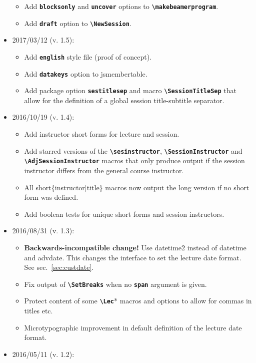 \documentclass[english]{article}
\newcommand*\jmacro[1]{\textbf{\texttt{#1}}}
\newcommand*\jcsmacro[1]{\jmacro{\textbackslash{#1}}}
\newcommand*\joption[1]{\textbf{\texttt{#1}}}
\newcommand*\jsmt{\textsf{jsmembertable}}
\begin{document}
\begin{itemize}
\begin{itemize}
	    \item Add \joption{blocksonly} and \joption{uncover} options to \jcsmacro{makebeamerprogram}.
	    \item Add \joption{draft} option to \jcsmacro{NewSession}.
    \end{itemize}
\item 2017/03/12 (v. 1.5):
	\begin{itemize}
		\item Add \joption{english} style file (proof of concept).
		\item Add \joption{datakeys} option to \jsmt.
		\item Add package option \joption{sestitlesep} and macro \jcsmacro{SessionTitleSep} that
		allow for the definition of a global session title-subtitle	separator.
	\end{itemize}
\item 2016/10/19 (v. 1.4):
	\begin{itemize}
		\item Add instructor short forms for lecture and session.
		\item Add starred versions of the \jcsmacro{sesinstructor}, \jcsmacro{SessionInstructor} and \jcsmacro{AdjSessionInstructor} macros that only produce output if the session instructor differs from the general course instructor.
		\item All short\{instructor|title\} macros now output the long version if no short form was defined.
		\item Add boolean tests for unique short forms and session instructors.
	\end{itemize}
\item 2016/08/31 (v. 1.3):
     \begin{itemize}
     	\item \textbf{Backwards-incompatible change!} Use \textsf{datetime2} instead of \textsf{datetime} and \textsf{advdate}.
     	      This changes the interface to set the lecture date format. See sec.~\ref{sec:custdate}.
     	\item Fix output of \jcsmacro{SetBreaks} when no \joption{span} argument is given.
     	\item Protect content of some \jcsmacro{Lec}* macros and options to allow for commas in
     	      titles etc.
        \item Microtypographic improvement in default definition of the lecture date format.
	 \end{itemize}
\item 2016/05/11 (v. 1.2):

\end{itemize}
\end{document}

